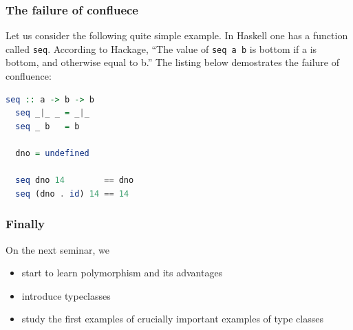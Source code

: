 \documentclass[10pt,pdf,utf8,russian,aspectratio=169]{beamer}
\begin{document}
\begin{frame}[fragile]
  \frametitle{The failure of confluece}

  Let us consider the following quite simple example. In Haskell one has a function called \verb"seq". According to Hackage, ``The value of \verb"seq a b" is bottom if a is bottom, and otherwise equal to b.'' The listing below demostrates the failure of confluence:

  \begin{lstlisting}[language=Haskell]
  seq :: a -> b -> b
  seq _|_ _ = _|_
  seq _ b   = b

  dno = undefined

  seq dno 14        == dno
  seq (dno . id) 14 == 14
  \end{lstlisting}

\end{frame}

\begin{frame}
  \frametitle{Finally}


On the next seminar, we
\begin{itemize}
  \item start to learn polymorphism and its advantages
  \item introduce typeclasses
  \item study the first examples of crucially important examples of type classes
\end{itemize}
\end{frame}
\end{document}
